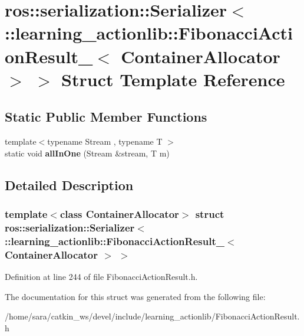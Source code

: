 \hypertarget{structros_1_1serialization_1_1Serializer_3_01_1_1learning__actionlib_1_1FibonacciActionResult___513b579502f00e2bdc9bdba303645cc2}{}\section{ros\+:\+:serialization\+:\+:Serializer$<$ \+:\+:learning\+\_\+actionlib\+:\+:Fibonacci\+Action\+Result\+\_\+$<$ Container\+Allocator $>$ $>$ Struct Template Reference}
\label{structros_1_1serialization_1_1Serializer_3_01_1_1learning__actionlib_1_1FibonacciActionResult___513b579502f00e2bdc9bdba303645cc2}
\subsection*{Static Public Member Functions}
\begin{DoxyCompactItemize}
\item 
\mbox{\label{structros_1_1serialization_1_1Serializer_3_01_1_1learning__actionlib_1_1FibonacciActionResult___513b579502f00e2bdc9bdba303645cc2_a5740f9b8648c49f049a008ccebae345e}} 
{\footnotesize template$<$typename Stream , typename T $>$ }\\static void {\bfseries all\+In\+One} (Stream \&stream, T m)
\end{DoxyCompactItemize}


\subsection{Detailed Description}
\subsubsection*{template$<$class Container\+Allocator$>$\newline
struct ros\+::serialization\+::\+Serializer$<$ \+::learning\+\_\+actionlib\+::\+Fibonacci\+Action\+Result\+\_\+$<$ Container\+Allocator $>$ $>$}



Definition at line 244 of file Fibonacci\+Action\+Result.\+h.



The documentation for this struct was generated from the following file\+:\begin{DoxyCompactItemize}
\item 
/home/sara/catkin\+\_\+ws/devel/include/learning\+\_\+actionlib/Fibonacci\+Action\+Result.\+h\end{DoxyCompactItemize}
